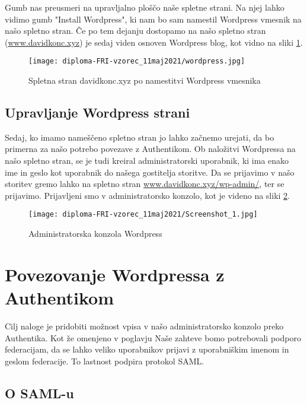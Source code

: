 \documentclass[a4paper,12pt,openright]{book}
\begin{document}
Gumb nas preusmeri na upravljalno ploščo naše spletne strani. Na njej lahko vidimo gumb "Install Wordpress", ki nam bo sam namestil Wordpress vmesnik na našo spletno stran. Če po tem dejanju dostopamo na našo spletno stran (\href{www.davidkonc.xyz}{www.davidkonc.xyz}) je sedaj viden osnoven Wordpress blog, kot vidno na sliki \ref{fig:wordpressOsn}.

\begin{figure}[H]
\hspace{-4cm}
\texttt{[image: diploma-FRI-vzorec\_11maj2021/wordpress.jpg]}
\caption{Spletna stran davidkonc.xyz po namestitvi Wordpress vmesnika}
\label{fig:wordpressOsn}
\end{figure}



\subsection{Upravljanje Wordpress strani}

Sedaj, ko imamo nameščeno spletno stran jo lahko začnemo urejati, da bo primerna za našo potrebo povezave z Authentikom. Ob naložitvi Wordpressa na našo spletno stran, se je tudi kreiral administratorski uporabnik, ki ima enako ime in geslo kot uporabnik do našega gostitelja storitve. Da se prijavimo v našo storitev gremo lahko na spletno stran \href{www.davidkonc.xyz/wp-admin/}{www.davidkonc.xyz/wp-admin/}, ter se prijavimo.
\newline
Prijavljeni smo v administratorsko konzolo, kot je videno na sliki \ref{fig:adminWord}.

\begin{figure}[H]
\hspace{-2cm}
\texttt{[image: diploma-FRI-vzorec\_11maj2021/Screenshot\_1.jpg]}
\caption{Administratorska konzola Wordpress}
\label{fig:adminWord}
\end{figure}

\section{Povezovanje Wordpressa z Authentikom}

Cilj naloge je pridobiti možnost vpisa v našo administratorsko konzolo preko Authentika. Kot že omenjeno v poglavju Naše zahteve bomo potrebovali podporo federacijam, da se lahko veliko uporabnikov prijavi z uporabniškim imenom in geslom federacije. To lastnost podpira protokol SAML.

\subsection{O SAML-u}
\end{document}
